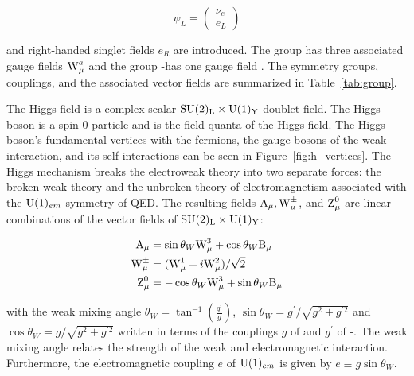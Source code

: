 \begin{equation}
  \psi_{L}=\left(\begin{array}{l}
  \nu_{e} \\
  e_{L}
  \end{array}\right)
\end{equation}

and right-handed singlet fields $e_{R}$ are introduced. The group \iso has three associated gauge fields $\text{W}_{\mu}^{a}$ and the group \hyp has one gauge field \bmu. The symmetry groups, couplings, and the associated vector fields are summarized in Table~\ref{tab:group}.

The Higgs field is a complex scalar $\text{SU}(2)_{\text{L}} \times \text{U}(1)_{\text{Y}}$ doublet field. The Higgs boson is a spin-0 particle and is the field quanta of the Higgs field. The Higgs boson's fundamental vertices with the fermions, the gauge bosons of the weak interaction, and its self-interactions can be seen in Figure~\ref{fig:h_vertices}. The Higgs mechanism breaks the electroweak theory into two separate forces: the broken weak theory and the unbroken theory of electromagnetism associated with the $\text{U}(1)_{em}$ symmetry of QED. The resulting fields $\text{A}_{\mu}, \text{W}_{\mu}^{\pm}$, and $\text{Z}_{\mu}^{0}$ are linear combinations of the vector fields of $\text{SU}(2)_{\text{L}} \times \text{U}(1)_{\text{Y}}$:

\begin{equation}
  \begin{aligned}
    \text{A}_{\mu}&=\sin \theta_{W} \text{W}_{\mu}^{3}+\cos \theta_{W} \text{B}_{\mu} \\
    \text{W}_{\mu}^{\pm}&=(\text{W}_{\mu}^{1} \mp i \text{W}_{\mu}^2) / \sqrt{2} \\
    \text{Z}_{\mu}^{0}&=-\cos \theta_{W} \text{W}_{\mu}^{3}+\sin \theta_{W} \text{B}_{\mu}
  \end{aligned}
\end{equation}

with the weak mixing angle $\theta_{W}=\tan ^{-1}(\frac{g^{\prime}}{g})$, $\sin \theta_{W}=g^{\prime} / \sqrt{g^2+g^{\prime 2}}$ and $\cos \theta_{W}=g / \sqrt{g^2+g^{\prime 2}}$ written in terms of the couplings $g$ of \iso and  $g^{\prime}$ of \hyp. The weak mixing angle relates the strength of the weak and electromagnetic interaction. Furthermore, the electromagnetic coupling $e$ of $\text{U}(1)_{em}$ is given by $e \equiv g \sin \theta_{W}$.

